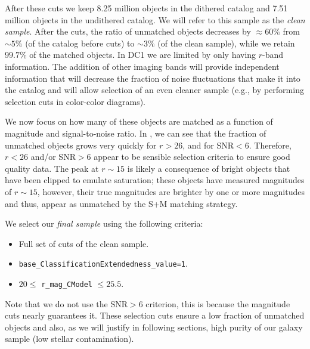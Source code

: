 \documentclass[\docopts]{\docclass}
\begin{document}
After these cuts we keep 8.25 million objects in the dithered catalog and 7.51 million objects in the undithered catalog. We will refer to this sample as the \textit{clean sample}. After the cuts, the ratio of unmatched objects decreases by $\approx 60\%$ from $\sim 5\%$ (of the catalog before cuts) to $\sim 3\%$ (of the clean sample), while we retain $99.7\%$ of the matched objects. In DC1 we are limited by only having $r$-band information. The addition of other imaging bands will provide independent information that will decrease the fraction of noise fluctuations that make it into the catalog and will allow selection of an even cleaner sample (e.g., by performing selection cuts in color-color diagrams).


We now focus on how many of these objects are matched as a function of magnitude and signal-to-noise ratio. In , we can see that the fraction of unmatched objects grows very quickly for $r > 26$, and for SNR$<6$. Therefore, $r < 26$ and/or SNR$>6$ appear to be sensible selection criteria to ensure good quality data. The peak at $r \sim 15$ is likely a consequence of bright objects that have been clipped to emulate saturation; these objects have measured magnitudes of $r \sim 15$, however, their true magnitudes are brighter by one or more magnitudes and thus, appear as unmatched by the \textsf{S+M} matching strategy. 

We select our \textit{final sample} using the following criteria:

\begin{itemize}
\item Full set of cuts of the clean sample.
\item \texttt{base\_ClassificationExtendedness\_value=1}.
\item $20 \leq$ \texttt{r\_mag\_CModel} $\leq 25.5$. 
\end{itemize}
Note that we do not use the SNR$>6$ criterion, this is because the magnitude cuts nearly guarantees it.
These selection cuts ensure a low fraction of unmatched objects and also, as we will justify in following sections, high purity of our galaxy sample (low stellar contamination).
\end{document}
